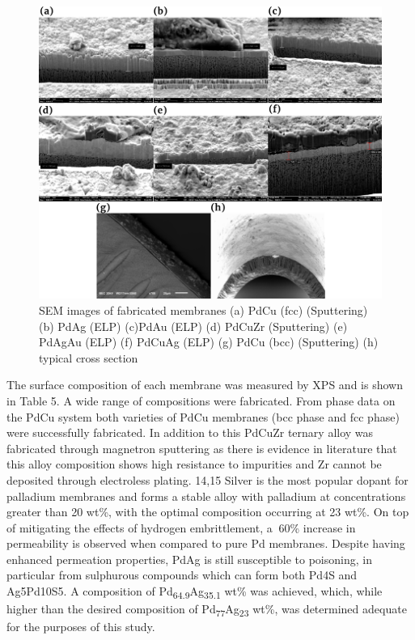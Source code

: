 \begin{figure}
    \includegraphics[width=\linewidth]{figures/Semxsect.png}
    \caption{SEM images of fabricated membranes (a) PdCu (fcc) (Sputtering) (b) PdAg (ELP) (c)PdAu (ELP) (d) PdCuZr (Sputtering) (e) PdAgAu (ELP) (f) PdCuAg (ELP) (g) PdCu (bcc) (Sputtering) (h) typical cross section}
    \label{fig:1}
\end{figure}
The surface composition of each membrane was measured by XPS and is shown in Table 5. A wide range of compositions were fabricated. From phase data on the PdCu system \cite{Roa2003, Nayebossadri2013} both varieties of PdCu membranes (bcc phase and fcc phase) were successfully fabricated. In addition to this PdCuZr ternary alloy was fabricated through magnetron sputtering as there is evidence in literature that this alloy composition shows high resistance to impurities and Zr cannot be deposited through electroless plating. 14,15
Silver is the most popular dopant for palladium membranes and forms a stable alloy with palladium at concentrations greater than 20 wt\%, with the optimal composition occurring at 23 wt\%. On top of mitigating the effects of hydrogen embrittlement, a $~$60\% increase in permeability is observed when compared to pure Pd membranes. Despite having enhanced permeation properties, PdAg is still susceptible to poisoning, in particular from sulphurous compounds which can form both Pd4S and Ag5Pd10S5. A composition of Pd\textsubscript{64.9}Ag\textsubscript{35.1} wt\% was achieved, which, while higher than the desired composition of Pd\textsubscript{77}Ag\textsubscript{23} wt\%, was determined adequate for the purposes of this study.

